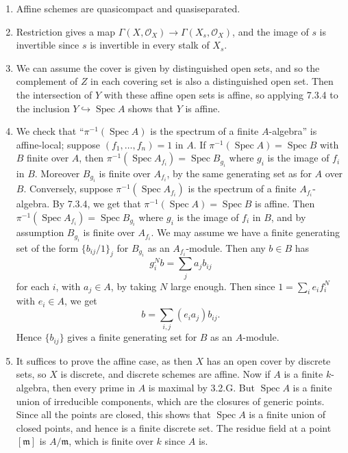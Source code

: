 \documentclass{report}
\newcommand{\m}{\mathfrak{m}}
\renewcommand{\O}{\mathscr{O}} %
\DeclareMathOperator{\Spec}{Spec}
\begin{document}
\begin{enumerate}[label=\textbf{7.3.\Alph*.}]
	\item Affine schemes are quasicompact and quasiseparated.

	\item Restriction gives a map $\Gamma(X,\O_X)\to\Gamma(X_s,\O_X)$, and the
	      image of $s$ is invertible since $s$ is invertible in every stalk of
	      $X_s$.

	\item We can assume the cover is given by distinguished open sets, and so
	      the complement of $Z$ in each covering set is also a distinguished open
	      set. Then the intersection of $Y$ with these affine open sets is affine,
	      so applying 7.3.4 to the inclusion $Y\hookrightarrow\Spec A$ shows that
	      $Y$ is affine.

	\item We check that ``$\pi^{-1}(\Spec A)$ is the spectrum of a finite
	      $A$-algebra'' is affine-local; suppose $(f_1,\ldots,f_n)=1$ in $A$. If
	      $\pi^{-1}(\Spec A)=\Spec B$ with $B$ finite over $A$, then
	      $\pi^{-1}(\Spec A_{f_i})=\Spec B_{g_i}$ where $g_i$ is the image of
	      $f_i$ in $B$. Moreover $B_{g_i}$ is finite over $A_{f_i}$, by the same
	      generating set as for $A$ over $B$. Conversely, suppose
	      $\pi^{-1}(\Spec A_{f_i})$ is the spectrum of a finite
	      $A_{f_i}$-algebra. By 7.3.4, we get that $\pi^{-1}(\Spec A)=\Spec B$
	      is affine. Then $\pi^{-1}(\Spec A_{f_i})=\Spec B_{g_i}$ where $g_i$ is
	      the image of $f_i$ in $B$, and by assumption $B_{g_i}$ is finite over
	      $A_{f_i}$. We may assume we have a finite generating set of the form
	      $\{b_{ij}/1\}_j$ for $B_{g_i}$ as an $A_{f_i}$-module. Then any
	      $b\in B$ has
	      \begin{equation*}
		      g_i^Nb = \sum_ja_jb_{ij}
	      \end{equation*}
	      for each $i$, with $a_j\in A$, by taking $N$ large enough. Then since
	      $1=\sum_ie_if_i^N$ with $e_i\in A$, we get
	      \begin{equation*}
		      b = \sum_{i,j}(e_ia_j)b_{ij}.
	      \end{equation*}
	      Hence $\{b_{ij}\}$ gives a finite generating set for $B$ as an
	      $A$-module.

	\item It suffices to prove the affine case, as then $X$ has an open cover
	      by discrete sets, so $X$ is discrete, and discrete schemes are affine.
	      Now if $A$ is a finite $k$-algebra, then every prime in $A$ is maximal
	      by 3.2.G. But $\Spec A$ is a finite union of irreducible components,
	      which are the closures of generic points. Since all the points are
	      closed, this shows that $\Spec A$ is a finite union of closed points,
	      and hence is a finite discrete set. The residue field at a point
	      $[\m]$ is $A/\m$, which is finite over $k$ since $A$ is.


\end{enumerate}
\end{document}
